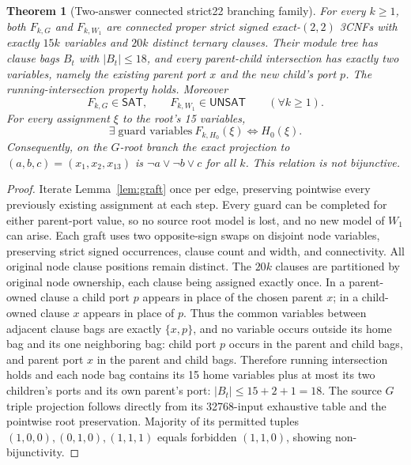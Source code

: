 \documentclass[11pt]{article}
\newtheorem{theorem}{Theorem}
\newcommand{\SAT}{\mathsf{SAT}}
\newcommand{\UNSAT}{\mathsf{UNSAT}}
\begin{document}
\begin{theorem}[Two-answer connected strict22 branching family]\label{thm:family}
For every $k\ge1$, both $F_{k,G}$ and $F_{k,W_1}$ are connected proper strict signed exact-$(2,2)$ 3CNFs with exactly $15k$ variables and $20k$ distinct ternary clauses. Their module tree has clause bags $B_t$ with $|B_t|\le18$, and every parent-child intersection has exactly two variables, namely the existing parent port $x$ and the new child's port $p$. The running-intersection property holds. Moreover
\[
F_{k,G}\in\SAT,\qquad F_{k,W_1}\in\UNSAT\qquad(\forall k\ge1).
\]
For every assignment $\xi$ to the root's 15 variables,
\[
\exists\;\text{guard variables}\ F_{k,H_0}(\xi)
\iff H_0(\xi).
\]
Consequently, on the $G$-root branch the exact projection to $(a,b,c)=(x_1,x_2,x_{13})$ is $\neg a\lor\neg b\lor c$ for all $k$. This relation is not bijunctive.
\end{theorem}
\begin{proof}
Iterate Lemma~\ref{lem:graft} once per edge, preserving pointwise every previously existing assignment at each step. Every guard can be completed for either parent-port value, so no source root model is lost, and no new model of $W_1$ can arise. Each graft uses two opposite-sign swaps on disjoint node variables, preserving strict signed occurrences, clause count and width, and connectivity. All original node clause positions remain distinct. The $20k$ clauses are partitioned by original node ownership, each clause being assigned exactly once. In a parent-owned clause a child port $p$ appears in place of the chosen parent $x$; in a child-owned clause $x$ appears in place of $p$. Thus the common variables between adjacent clause bags are exactly $\{x,p\}$, and no variable occurs outside its home bag and its one neighboring bag: child port $p$ occurs in the parent and child bags, and parent port $x$ in the parent and child bags. Therefore running intersection holds and each node bag contains its 15 home variables plus at most its two children's ports and its own parent's port: $|B_t|\le15+2+1=18$. The source $G$ triple projection follows directly from its 32768-input exhaustive table and the pointwise root preservation. Majority of its permitted tuples $(1,0,0),(0,1,0),(1,1,1)$ equals forbidden $(1,1,0)$, showing non-bijunctivity.
\end{proof}
\end{document}
